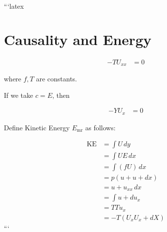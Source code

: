 ```latex
\section*{Causality and Energy}

\begin{align}
    -T U_{xx} &= 0
\end{align}

where \( f, T \) are constants.

If we take \( c = E \), then

\begin{align}
    -Y U_{x} &= 0
\end{align}

Define Kinetic Energy \( E_{\text{mr}} \) as follows:

\begin{align}
    \text{KE} &= \int U \, dy \\
    &= \int U E \, dx \\
    &= \int (f U) \, dx \\
    &= p(u + u + dx) \\
    &= u + u_{xx} \, dx \\
    &= \int u + du_{x} \\
    &= T T u_{x} \\
    &= -T(U_{x} U_{x} + dX)
\end{align}
```
